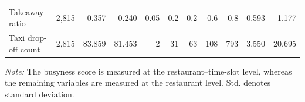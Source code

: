 \documentclass[conference]{IEEEtran}
\begin{document}
\begin{table}[!t]
{\begin{tabular}{lrrrrrrrrrr}
            Takeaway ratio
            & 2,815 & 0.357 & 0.240 & 0.05 & 0.2 & 0.2 & 0.6 & 0.8
            & 0.593 & -1.177 \\

            Taxi drop-off count
            & 2,815 & 83.859 & 81.453 & 2 & 31 & 63 & 108 & 793
            & 3.550 & 20.695 \\

            \bottomrule
        \end{tabular}
    }

    \vspace{2pt}

    \begin{minipage}{\textwidth}
        \footnotesize
        \textit{Note:} The busyness score is measured at the
        restaurant--time-slot level, whereas the remaining variables are
        measured at the restaurant level. Std. denotes standard deviation.
    \end{minipage}
\end{table}
\end{document}
